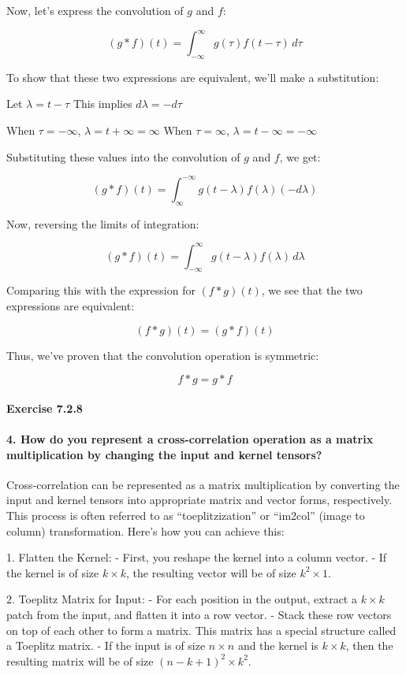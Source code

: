 Now, let's express the convolution of \( g \) and \( f \):

\[ (g * f)(t) = \int_{-\infty}^{\infty} g(\tau) f(t - \tau) \, d\tau \]

To show that these two expressions are equivalent, we'll make a substitution:

Let \( \lambda = t - \tau \)
This implies \( d\lambda = -d\tau \)

When \( \tau = -\infty \), \( \lambda = t + \infty = \infty \)
When \( \tau = \infty \), \( \lambda = t - \infty = -\infty \)

Substituting these values into the convolution of \( g \) and \( f \), we get:

\[ (g * f)(t) = \int_{\infty}^{-\infty} g(t - \lambda) f(\lambda) (-d\lambda) \]

Now, reversing the limits of integration:

\[ (g * f)(t) = \int_{-\infty}^{\infty} g(t - \lambda) f(\lambda) \, d\lambda \]

Comparing this with the expression for \( (f * g)(t) \), we see that the two expressions are equivalent:

\[ (f * g)(t) = (g * f)(t) \]

Thus, we've proven that the convolution operation is symmetric:

\[ f * g = g * f \]


\paragraph{Exercise 7.2.8}

\paragraph{4. How do you represent a cross-correlation operation as a matrix multiplication by changing the input and kernel tensors?}

Cross-correlation can be represented as a matrix multiplication by converting the input and kernel tensors into appropriate matrix and vector forms, respectively.
This process is often referred to as ``toeplitzization'' or ``im2col'' (image to column) transformation. Here's how you can achieve this:

1. Flatten the Kernel:
    - First, you reshape the kernel into a column vector.
    - If the kernel is of size \( k \times k \), the resulting vector will be of size \( k^2 \times 1 \).

2. Toeplitz Matrix for Input:
    - For each position in the output, extract a \( k \times k \) patch from the input, and flatten it into a row vector.
    - Stack these row vectors on top of each other to form a matrix. This matrix has a special structure called a Toeplitz matrix.
    - If the input is of size \( n \times n \) and the kernel is \( k \times k \), then the resulting matrix will be of size \( \left(n-k+1\right)^2   \times k^2 \).

